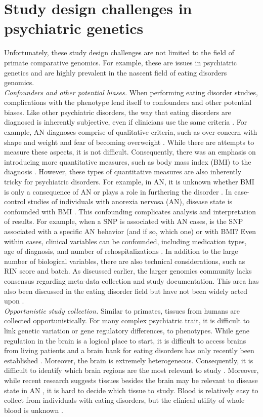 \section{Study design challenges in psychiatric genetics}
Unfortunately, these study design challenges are not limited to the field of primate comparative genomics. For example, these are issues in psychiatric genetics and are highly prevalent in the nascent field of eating disorders genomics. \\
\textit{Confounders and other potential biases.} When performing eating disorder studies, complications with the phenotype lend itself to confounders and other potential biases. Like other psychiatric disorders, the way that eating disorders are diagnosed is inherently subjective, even if clinicians use the same criteria \cite{RN2643, RN2461}. For example, AN diagnoses comprise of qualitative criteria, such as over-concern with shape and weight and fear of becoming overweight \cite{RN2668}. While there are attempts to measure these aspects, it is not difficult. Consequently, there was an emphasis on introducing more quantitative measures, such as body mass index (BMI) to the diagnosis \cite{RN4372}. However, these types of quantitative measures are also inherently tricky for psychiatric disorders. For example, in AN, it is unknown whether BMI is only a consequence of AN or plays a role in furthering the disorder \cite{RN4372}. In case-control studies of individuals with anorexia nervosa (AN), disease state is confounded with BMI \cite{RN1166, RN4568}. This confounding complicates analysis and interpretation of results. For example, when a SNP is associated with AN cases, is the SNP associated with a specific AN behavior (and if so, which one) or with BMI? 
Even within cases, clinical variables can be confounded, including medication types, age of diagnosis, and number of rehospitalizations \cite{RN1411}. In addition to the large number of biological variables, there are also technical considerations, such as RIN score and batch. As discussed earlier, the larger genomics community lacks consensus regarding meta-data collection and study documentation. This area has also been discussed in the eating disorder field but have not been widely acted upon \cite{RN4569}. 
\\
\textit{Opportunistic study collection.} Similar to primates, tissues from humans are collected opportunistically. For many complex psychiatric trait, it is difficult to link genetic variation or gene regulatory differences, to phenotypes. While gene regulation in the brain is a logical place to start, it is difficult to access brains from living patients and a brain bank for eating disorders has only recently been established \cite{RN4533}. Moreover, the brain is extremely heterogeneous. Consequently, it is difficult to identify which brain regions are the most relevant to study \cite{RN3415}. Moreover, while recent research suggests tissues besides the brain may be relevant to disease state in AN \cite{RN10, RN4567, RN4568}, it is hard to decide which tissue to study. Blood is relatively easy to collect from individuals with eating disorders, but the clinical utility of whole blood is unknown \cite{RN1411}. 
